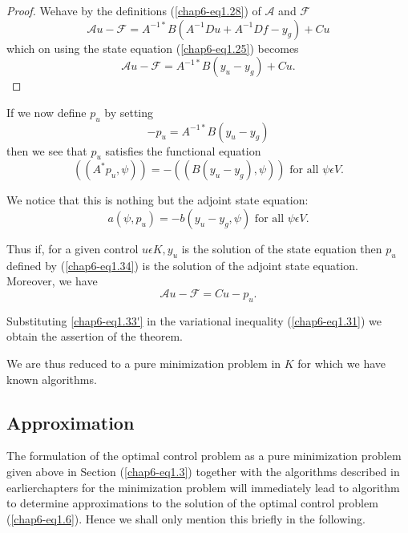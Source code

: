 \begin{proof}
We\pageoriginale  have by the definitions (\ref{chap6-eq1.28}) of
$\mathscr{A}$ and $\mathscr{F}$ 
$$
\mathscr{A} u - \mathscr{F} = A^{-1*} B(A^{-1} Du + A^{-1} Df - y_{g}) + Cu
$$
which on using the state equation (\ref{chap6-eq1.25}) becomes 
\begin{equation*}
\mathscr{A} u - \mathscr{F} = A^{-1*} B(y_{u} - y_{g}) + Cu.\tag{1.33}\label{chap6-eq1.33}
\end{equation*}
\end{proof}

If we now define $p_{u}$ by setting
\begin{equation*}
-p_{u} = A^{-1*} B(y_{u}-y_{g})\tag{1.34}\label{chap6-eq1.34}
\end{equation*}
then we see that $p_{u}$ satisfies the functional equation
$$
((A^{*} p_{u}, \psi)) = -((B(y_{u}-y_{g}), \psi)) \text{ for all } \psi \epsilon V.
$$

We notice that this is nothing but the adjoint state equation:
$$
a(\psi, p_{u}) = -b(y_{u} - y_{g}, \psi) \text{ for all } \psi \epsilon V.
$$

Thus if, for a given control $u \epsilon K, y_{u}$ is the solution of
the state equation then $p_{u}$ defined by (\ref{chap6-eq1.34}) is the
solution of the adjoint state equation. Moreover, we have 
\begin{equation*}
\mathscr{A} u - \mathscr{F} = Cu - p_{u}.\tag*{$(1.33)'$}\label{chap6-eq1.33'}
\end{equation*}
 
Substituting \ref{chap6-eq1.33'} in the variational inequality
(\ref{chap6-eq1.31}) we obtain the assertion of the theorem. 

We are thus reduced to a pure minimization problem in $K$ for which we have known algorithms.

\subsection{Approximation}\label{chap6-subsec1.4}

The formulation of the optimal control problem as a pure minimization
problem given above in Section (\ref{chap6-eq1.3}) together with the
algorithms described in earlier\pageoriginale chapters for the
minimization problem will immediately lead to algorithm to determine
approximations to the solution of the optimal control problem
(\ref{chap6-eq1.6}). Hence we shall only mention this briefly in the
following. 

